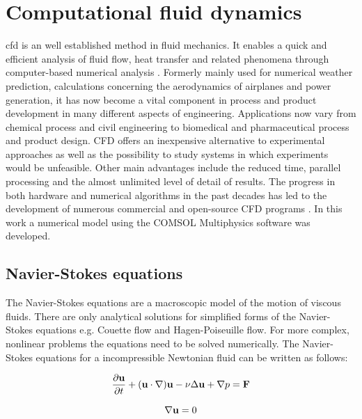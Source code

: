 \section{Computational fluid dynamics}
\label{sec:CFD}
\Gls{cfd} is an well established method in fluid mechanics. It enables a quick and efficient analysis of fluid flow, heat transfer and related phenomena through computer-based numerical analysis \cite{versteeg2007introduction}. Formerly mainly used for numerical weather prediction, calculations concerning the aerodynamics of airplanes and power generation, it has now become a vital component in process and
product development in many different aspects of engineering. Applications now
vary from chemical process and civil engineering to biomedical and pharmaceutical
process and product design. CFD offers an inexpensive alternative to experimental approaches as well as the possibility to study systems in which experiments
would be unfeasible. Other main advantages include the reduced time, parallel processing and the almost unlimited level of detail of results. The progress in both hardware and numerical algorithms in the past decades has led to the development of numerous commercial and open-source CFD programs \cite{ghia1982high}. In this work a numerical model using the COMSOL Multiphysics software was developed.

\subsection{Navier-Stokes equations}
\label{subsec:Navier_Stokes}
The Navier-Stokes equations are a macroscopic model of the motion of viscous fluids. There are only analytical solutions for simplified forms of the Navier-Stokes equations e.g. Couette flow and Hagen-Poiseuille flow. For more complex, nonlinear problems the equations need to be solved numerically. The Navier-Stokes equations for a incompressible Newtonian fluid can be written as follows: 

\begin{equation}
{\partial{\bf u}\over{\partial t}} + ({\bf u} \cdot \nabla) {\bf u} - \nu\Delta{\bf u}+ \nabla p = {\bf F}
\label{eq:Concervation of momentum }
\end{equation}

\begin{equation}
\nabla{\bf u} = 0
\label{eq:Conservation of mass }
\end{equation}

